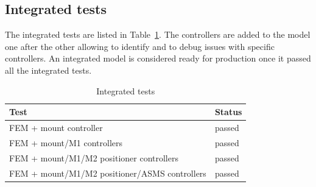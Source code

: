 \documentclass{gmto}
\begin{document}
\subsection{Integrated tests}
\label{sec:int-tests}

The integrated tests are listed in Table~\ref{tab:int-tests}.
The controllers are added to the model one after the other allowing to identify
and to debug issues with specific controllers.
An integrated model is considered ready for production once it passed all the
integrated tests.

\begin{table}
  \centering
  \begin{tabular}{ll}\toprule
    Test & Status \\\midrule
    FEM + mount controller & passed \\
    FEM + mount/M1 controllers & passed \\
    FEM + mount/M1/M2 positioner controllers & passed \\
    FEM + mount/M1/M2 positioner/ASMS controllers & passed \\\bottomrule
  \end{tabular}
  \caption{Integrated tests}
  \label{tab:int-tests}
\end{table}


\printbibliography
\end{document}
